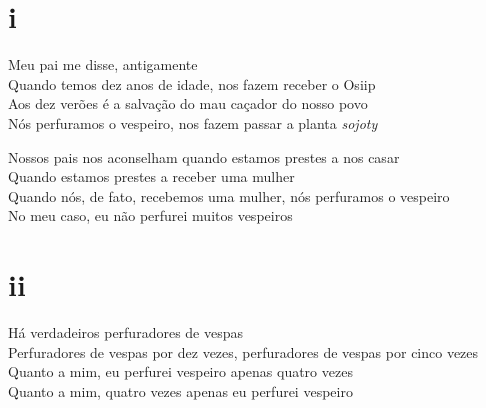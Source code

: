 
\section{i}

\begin{linenumbers}\begingroup\raggedright
 \noindent Meu pai me disse, antigamente\\
 Quando temos dez anos de idade, nos fazem receber o Osiip\\
 Aos dez verões é a salvação do mau caçador do nosso povo\\
 Nós perfuramos o vespeiro, nos fazem passar a planta \textit{sojoty}

\end{linenumbers}\endgroup

\bigskip

\begin{linenumbers}\begingroup\raggedright
 
\noindent Nossos pais nos aconselham quando estamos prestes a nos casar\\
 Quando estamos prestes a receber uma mulher\\
 Quando nós, de fato, recebemos uma mulher, nós perfuramos o vespeiro\\
 No meu caso, eu não perfurei muitos vespeiros
 
 
\medskip
\section{ii}

 \noindent Há verdadeiros perfuradores de vespas\\
 Perfuradores de vespas por dez vezes, perfuradores de vespas por cinco vezes\\
 Quanto a mim, eu perfurei vespeiro apenas quatro vezes\\
 Quanto a mim, quatro vezes apenas eu perfurei vespeiro
 
\end{linenumbers}\endgroup

